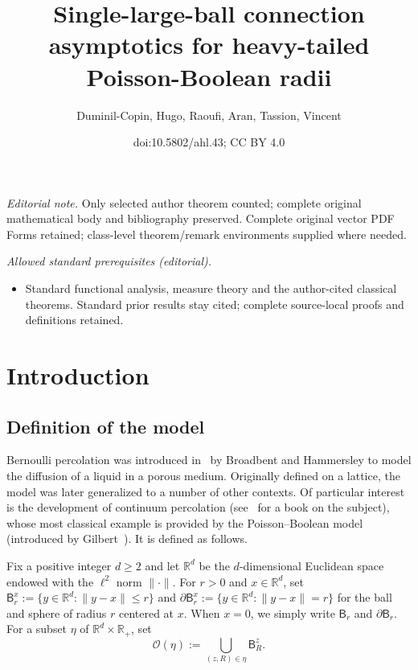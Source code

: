 \documentclass[10pt]{amsart}
\title{Single-large-ball connection asymptotics for heavy-tailed Poisson-Boolean radii}
\author{Duminil-Copin, Hugo, Raoufi, Aran, Tassion, Vincent}
\date{doi:10.5802/ahl.43; CC BY 4.0}
\theoremstyle{definition}\newtheorem{defi}[theo]{Definition}\newtheorem{rema}[theo]{Remark}\newtheorem{exam}[theo]{Example}\newtheorem{exem}[theo]{Example}\newtheorem{nota}[theo]{Notation}
\begin{document}
\maketitle
\noindent\textit{Editorial note.} Only selected author theorem counted; complete original mathematical body and bibliography preserved. Complete original vector PDF Forms retained; class-level theorem/remark environments supplied where needed.\par\medskip
\noindent\textit{Allowed standard prerequisites (editorial).}\begin{itemize}
\item Standard functional analysis, measure theory and the author-cited classical theorems. Standard prior results stay cited; complete source-local proofs and definitions retained.
\end{itemize}\medskip



\section{Introduction}

\subsection{Definition of the model}
Bernoulli percolation was introduced in~\cite{BroHam57} by Broadbent and Hammersley to model the diffusion of a liquid in a porous medium. Originally defined on a lattice, the model was later generalized to a number of other contexts. Of particular interest is the development of continuum percolation (see~\cite{MeeRoy08} for a book on the subject), whose most classical example is provided by the Poisson--Boolean model (introduced by Gilbert~\cite{Gil}). It is defined as follows.

Fix a positive integer $d\ge2$ and let ${\mathbb R}^d$ be the $d$-dimensional Euclidean space endowed with the $\ell^2$ norm $\|\cdot\|$. For $r>0$ and $x\in{\mathbb R}^d$, set $\mathsf B_r^x:=\{y\in{\mathbb R}^d:\|y-x\|\le r\}$ and $\partial\mathsf B_r^x:=\{y\in {\mathbb R}^d:\|y-x\|=r\}$ for the ball and sphere of radius $r$ centered at $x$. When $x=0$, we simply write $\mathsf B_r$ and $\partial\mathsf B_r$. For a subset $\eta$ of ${\mathbb R}^d\times{\mathbb R}_+$, set
\[
{\mathcal O}(\eta):=\bigcup_{(z,R)\in\eta} \mathsf B_R^z.
\]
\end{document}
